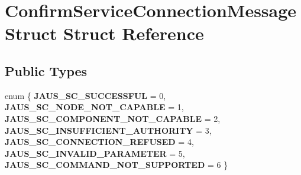 \hypertarget{struct_confirm_service_connection_message_struct}{\section{\-Confirm\-Service\-Connection\-Message\-Struct \-Struct \-Reference}
\label{struct_confirm_service_connection_message_struct}
}
\subsection*{\-Public \-Types}
\begin{DoxyCompactItemize}
\item 
enum \{ \*
{\bfseries \-J\-A\-U\-S\-\_\-\-S\-C\-\_\-\-S\-U\-C\-C\-E\-S\-S\-F\-U\-L} =  0, 
{\bfseries \-J\-A\-U\-S\-\_\-\-S\-C\-\_\-\-N\-O\-D\-E\-\_\-\-N\-O\-T\-\_\-\-C\-A\-P\-A\-B\-L\-E} =  1, 
{\bfseries \-J\-A\-U\-S\-\_\-\-S\-C\-\_\-\-C\-O\-M\-P\-O\-N\-E\-N\-T\-\_\-\-N\-O\-T\-\_\-\-C\-A\-P\-A\-B\-L\-E} =  2, 
{\bfseries \-J\-A\-U\-S\-\_\-\-S\-C\-\_\-\-I\-N\-S\-U\-F\-F\-I\-C\-I\-E\-N\-T\-\_\-\-A\-U\-T\-H\-O\-R\-I\-T\-Y} =  3, 
\*
{\bfseries \-J\-A\-U\-S\-\_\-\-S\-C\-\_\-\-C\-O\-N\-N\-E\-C\-T\-I\-O\-N\-\_\-\-R\-E\-F\-U\-S\-E\-D} =  4, 
{\bfseries \-J\-A\-U\-S\-\_\-\-S\-C\-\_\-\-I\-N\-V\-A\-L\-I\-D\-\_\-\-P\-A\-R\-A\-M\-E\-T\-E\-R} =  5, 
{\bfseries \-J\-A\-U\-S\-\_\-\-S\-C\-\_\-\-C\-O\-M\-M\-A\-N\-D\-\_\-\-N\-O\-T\-\_\-\-S\-U\-P\-P\-O\-R\-T\-E\-D} =  6
 \}
\end{DoxyCompactItemize}

